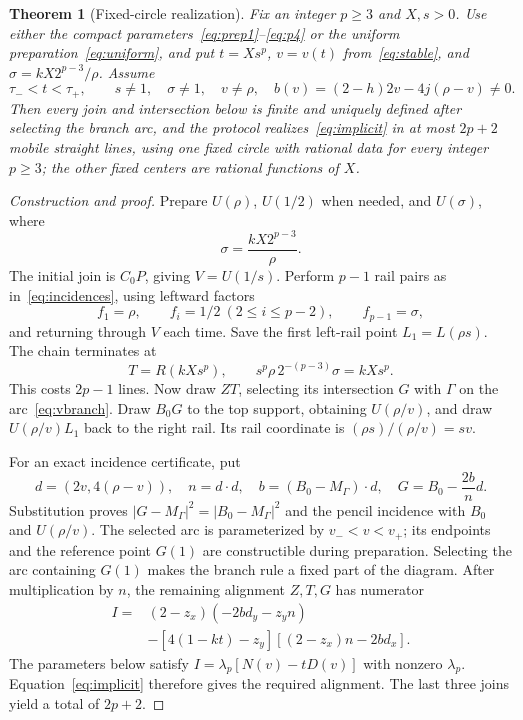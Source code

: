\documentclass[11pt,a4paper]{article}
\newtheorem{theorem}{Theorem}[section]
\theoremstyle{remark}\newtheorem{remark}[theorem]{Remark}
\begin{document}
\begin{theorem}[Fixed-circle realization]\label{thm:construction}
Fix an integer $p\ge3$ and $X,s>0$. Use either the compact parameters~\eqref{eq:prep1}--\eqref{eq:p4} or the uniform preparation~\eqref{eq:uniform}, and put $t=Xs^p$, $v=v(t)$ from~\eqref{eq:stable}, and $\sigma=kX2^{p-3}/\rho$. Assume
\[
 \tau_-<t<\tau_+,\qquad s\ne1,\quad \sigma\ne1,\quad v\ne\rho,
 \quad b(v)=(2-h)2v-4j(\rho-v)\ne0.
\]
Then every join and intersection below is finite and uniquely defined after selecting the branch arc, and the protocol realizes~\eqref{eq:implicit} in at most $2p+2$ mobile straight lines, using one fixed circle with rational data for every integer $p\ge3$; the other fixed centers are rational functions of $X$.
\end{theorem}
\begin{proof}[Construction and proof]
Prepare $U(\rho)$, $U(1/2)$ when needed, and $U(\sigma)$, where
\begin{equation}\label{eq:beta}
 \sigma=\frac{kX2^{p-3}}\rho.
\end{equation}
The initial join is $C_0P$, giving $V=U(1/s)$. Perform $p-1$ rail pairs as in~\eqref{eq:incidences}, using leftward factors
\[
 f_1=\rho,\qquad f_i=1/2\ (2\le i\le p-2),\qquad f_{p-1}=\sigma,
\]
and returning through $V$ each time. Save the first left-rail point $L_1=L(\rho s)$. The chain terminates at
\begin{equation}\label{eq:T}
 T=R(kXs^p),\qquad s^p\rho\,2^{-(p-3)}\sigma=kXs^p.
\end{equation}
This costs $2p-1$ lines. Now draw $ZT$, selecting its intersection $G$ with $\Gamma$ on the arc~\eqref{eq:vbranch}. Draw $B_0G$ to the top support, obtaining $U(\rho/v)$, and draw $U(\rho/v)L_1$ back to the right rail. Its rail coordinate is $(\rho s)/(\rho/v)=sv$.

For an exact incidence certificate, put
\[
 d=(2v,4(\rho-v)),\quad n=d\cdot d,\quad b=(B_0-M_\Gamma)\cdot d,
 \quad G=B_0-\frac{2b}{n}d.
\]
Substitution proves $|G-M_\Gamma|^2=|B_0-M_\Gamma|^2$ and the pencil incidence with $B_0$ and $U(\rho/v)$. The selected arc is parameterized by $v_-<v<v_+$; its endpoints and the reference point $G(1)$ are constructible during preparation. Selecting the arc containing $G(1)$ makes the branch rule a fixed part of the diagram. After multiplication by $n$, the remaining alignment $Z,T,G$ has numerator
\begin{align}
 I={}&(2-z_x)(-2bd_y-z_yn)\nonumber\\
 &-[4(1-kt)-z_y][(2-z_x)n-2bd_x].\label{eq:incidenceI}
\end{align}
The parameters below satisfy $I=\lambda_p[N(v)-tD(v)]$ with nonzero $\lambda_p$. Equation~\eqref{eq:implicit} therefore gives the required alignment. The last three joins yield a total of $2p+2$.
\end{proof}
\end{document}
